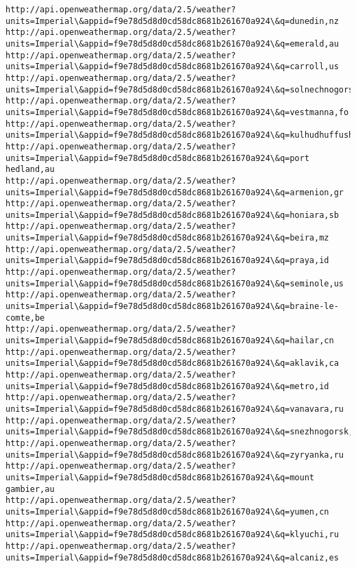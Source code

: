 \documentclass[11pt]{article}
\begin{document}
\begin{Verbatim}[commandchars=\\\{\}]
http://api.openweathermap.org/data/2.5/weather?units=Imperial\&appid=f9e78d5d8d0cd58dc8681b261670a924\&q=dunedin,nz
http://api.openweathermap.org/data/2.5/weather?units=Imperial\&appid=f9e78d5d8d0cd58dc8681b261670a924\&q=emerald,au
http://api.openweathermap.org/data/2.5/weather?units=Imperial\&appid=f9e78d5d8d0cd58dc8681b261670a924\&q=carroll,us
http://api.openweathermap.org/data/2.5/weather?units=Imperial\&appid=f9e78d5d8d0cd58dc8681b261670a924\&q=solnechnogorsk,ru
http://api.openweathermap.org/data/2.5/weather?units=Imperial\&appid=f9e78d5d8d0cd58dc8681b261670a924\&q=vestmanna,fo
http://api.openweathermap.org/data/2.5/weather?units=Imperial\&appid=f9e78d5d8d0cd58dc8681b261670a924\&q=kulhudhuffushi,mv
http://api.openweathermap.org/data/2.5/weather?units=Imperial\&appid=f9e78d5d8d0cd58dc8681b261670a924\&q=port hedland,au
http://api.openweathermap.org/data/2.5/weather?units=Imperial\&appid=f9e78d5d8d0cd58dc8681b261670a924\&q=armenion,gr
http://api.openweathermap.org/data/2.5/weather?units=Imperial\&appid=f9e78d5d8d0cd58dc8681b261670a924\&q=honiara,sb
http://api.openweathermap.org/data/2.5/weather?units=Imperial\&appid=f9e78d5d8d0cd58dc8681b261670a924\&q=beira,mz
http://api.openweathermap.org/data/2.5/weather?units=Imperial\&appid=f9e78d5d8d0cd58dc8681b261670a924\&q=praya,id
http://api.openweathermap.org/data/2.5/weather?units=Imperial\&appid=f9e78d5d8d0cd58dc8681b261670a924\&q=seminole,us
http://api.openweathermap.org/data/2.5/weather?units=Imperial\&appid=f9e78d5d8d0cd58dc8681b261670a924\&q=braine-le-comte,be
http://api.openweathermap.org/data/2.5/weather?units=Imperial\&appid=f9e78d5d8d0cd58dc8681b261670a924\&q=hailar,cn
http://api.openweathermap.org/data/2.5/weather?units=Imperial\&appid=f9e78d5d8d0cd58dc8681b261670a924\&q=aklavik,ca
http://api.openweathermap.org/data/2.5/weather?units=Imperial\&appid=f9e78d5d8d0cd58dc8681b261670a924\&q=metro,id
http://api.openweathermap.org/data/2.5/weather?units=Imperial\&appid=f9e78d5d8d0cd58dc8681b261670a924\&q=vanavara,ru
http://api.openweathermap.org/data/2.5/weather?units=Imperial\&appid=f9e78d5d8d0cd58dc8681b261670a924\&q=snezhnogorsk,ru
http://api.openweathermap.org/data/2.5/weather?units=Imperial\&appid=f9e78d5d8d0cd58dc8681b261670a924\&q=zyryanka,ru
http://api.openweathermap.org/data/2.5/weather?units=Imperial\&appid=f9e78d5d8d0cd58dc8681b261670a924\&q=mount gambier,au
http://api.openweathermap.org/data/2.5/weather?units=Imperial\&appid=f9e78d5d8d0cd58dc8681b261670a924\&q=yumen,cn
http://api.openweathermap.org/data/2.5/weather?units=Imperial\&appid=f9e78d5d8d0cd58dc8681b261670a924\&q=klyuchi,ru
http://api.openweathermap.org/data/2.5/weather?units=Imperial\&appid=f9e78d5d8d0cd58dc8681b261670a924\&q=alcaniz,es

\end{Verbatim}
\end{document}
